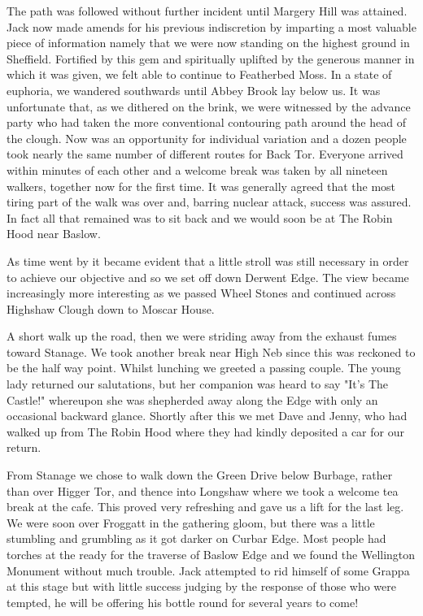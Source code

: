 \documentclass[a5paper,openany,font 10pt]{scrbook}
\begin{document}
The path was followed without further incident until Margery
Hill was attained. Jack now made amends for his previous
indiscretion by imparting a most valuable piece of information
namely that we were now standing on the highest ground in
Sheffield. Fortified by this gem and spiritually uplifted by the
generous manner in which it was given, we felt able to continue
to Featherbed Moss. In a state of euphoria, we wandered
southwards until Abbey Brook lay below us. It was unfortunate
that, as we dithered on the brink, we were witnessed by the
advance party who had taken the more conventional contouring path
around the head of the clough. Now was an opportunity for
individual variation and a dozen people took nearly the same
number of different routes for Back Tor. Everyone arrived within
minutes of each other and a welcome break was taken by all
nineteen walkers, together now for the first time. It was
generally agreed that the most tiring part of the walk was over
and, barring nuclear attack, success was assured. In fact all
that remained was to sit back and we would soon be at The Robin
Hood near Baslow.

As time went by it became evident that a little stroll was
still necessary in order to achieve our objective and so we set
off down Derwent Edge. The view became increasingly more
interesting as we passed Wheel Stones and continued across
Highshaw Clough down to Moscar House.

A short walk up the road, then we were striding away  from
the exhaust fumes toward Stanage. We took another break  near
High Neb since this was reckoned to be the half way point. Whilst
lunching we greeted a passing couple. The young lady returned our
 salutations, but her companion was heard to say "It's The
Castle!" whereupon she was shepherded away along the Edge with
only an occasional backward glance. Shortly after this we met
Dave and Jenny, who had walked up from The Robin Hood where they
had kindly deposited a car for our return.

From Stanage we chose to walk down the Green Drive below
Burbage, rather than over Higger Tor, and thence into Longshaw
where we took a welcome tea break at the cafe. This proved very
refreshing and gave us a lift for the last leg. We were soon over
Froggatt in the gathering gloom, but there was a little stumbling
and grumbling as it got darker on Curbar Edge. Most people had
torches at the ready for the traverse of Baslow Edge and we found
the Wellington Monument without much trouble. Jack attempted to
rid himself of some Grappa at this stage but with little success
  judging by the response of those who were tempted, he will be
offering his bottle round for several years to come!
\end{document}
